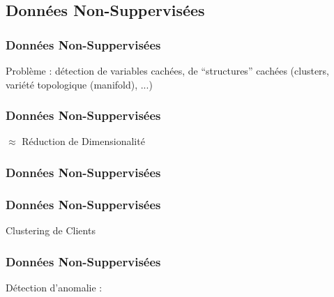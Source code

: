 \subsection{Données Non-Suppervisées}

\begin{frame}
  \frametitle{Données Non-Suppervisées}
  Problème : détection de variables cachées, de ``structures'' cachées (clusters, variété topologique (manifold), ...) \\ $\;$ \\
  \begin{minipage}[l]{0.69\linewidth}
  \end{minipage}\hfill
  \begin{minipage}[l]{0.29\linewidth}
  \end{minipage}\hfill
\end{frame}

\begin{frame}
  \frametitle{Données Non-Suppervisées}
  \begin{center}
    $\approx$ Réduction de Dimensionalité
  \end{center}
\end{frame}

\begin{frame}
  \frametitle{Données Non-Suppervisées}
  \begin{minipage}[l]{0.69\linewidth}
  \end{minipage}\hfill
  \begin{minipage}[l]{0.29\linewidth}
  \end{minipage}\hfill
\end{frame}

\begin{frame}
  \frametitle{Données Non-Suppervisées}
  Clustering de Clients
\end{frame}

\begin{frame}
  \frametitle{Données Non-Suppervisées}
  Détection d'anomalie :
\end{frame}
